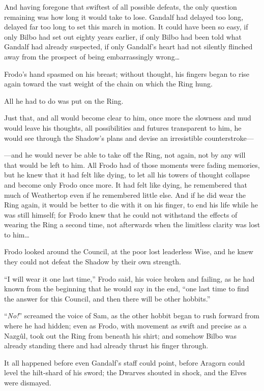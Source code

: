 And having foregone that swiftest of all possible defeats, the only question remaining was how long it would take to lose. Gandalf had delayed too long, delayed far too long to set this march in motion. It could have been so easy, if only Bilbo had set out eighty years earlier, if only Bilbo had been told what Gandalf had already suspected, if only Gandalf’s heart had not silently flinched away from the prospect of being embarrassingly wrong…

Frodo’s hand spasmed on his breast; without thought, his fingers began to rise again toward the vast weight of the chain on which the Ring hung.

All he had to do was put on the Ring.

Just that, and all would become clear to him, once more the slowness and mud would leave his thoughts, all possibilities and futures transparent to him, he would see through the Shadow’s plans and devise an irresistible counterstroke—

—and he would never be able to take off the Ring, not again, not by any will that would be left to him. All Frodo had of those moments were fading memories, but he knew that it had felt like dying, to let all his towers of thought collapse and become only Frodo once more. It had felt like dying, he remembered that much of Weathertop even if he remembered little else. And if he did wear the Ring again, it would be better to die with it on his finger, to end his life while he was still himself; for Frodo knew that he could not withstand the effects of wearing the Ring a second time, not afterwards when the limitless clarity was lost to him…

Frodo looked around the Council, at the poor lost leaderless Wise, and he knew they could not defeat the Shadow by their own strength.

“I will wear it one last time,” Frodo said, his voice broken and failing, as he had known from the beginning that he would say in the end, “one last time to find the answer for this Council, and then there will be other hobbits.”

“\emph{No!}” screamed the voice of Sam, as the other hobbit began to rush forward from where he had hidden; even as Frodo, with movement as swift and precise as a Nazgûl, took out the Ring from beneath his shirt; and somehow Bilbo was already standing there and had already thrust his finger through.

It all happened before even Gandalf’s staff could point, before Aragorn could level the hilt-shard of his sword; the Dwarves shouted in shock, and the Elves were dismayed.


